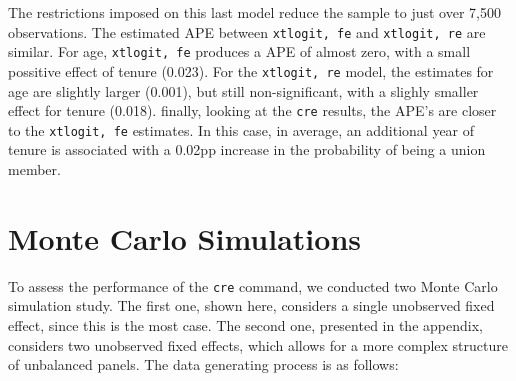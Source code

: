 \documentclass[bib]{statapress}
\begin{document}
\begin{table}[H]

\caption{\label{tbl-mfx2}Comparison of logit models: APE}


\end{table}%

The restrictions imposed on this last model reduce the sample to just
over 7,500 observations. The estimated APE between \texttt{xtlogit,\ fe}
and \texttt{xtlogit,\ re} are similar. For age, \texttt{xtlogit,\ fe}
produces a APE of almost zero, with a small possitive effect of tenure
(0.023). For the \texttt{xtlogit,\ re} model, the estimates for age are
slightly larger (0.001), but still non-significant, with a slighly
smaller effect for tenure (0.018). finally, looking at the \texttt{cre}
results, the APE's are closer to the \texttt{xtlogit,\ fe} estimates. In
this case, in average, an additional year of tenure is associated with a
0.02pp increase in the probability of being a union member.

\section{Monte Carlo Simulations}\label{sec-5}

To assess the performance of the \texttt{cre} command, we conducted two
Monte Carlo simulation study. The first one, shown here, considers a
single unobserved fixed effect, since this is the most case. The second
one, presented in the appendix, considers two unobserved fixed effects,
which allows for a more complex structure of unbalanced panels. The data
generating process is as follows:
\end{document}
